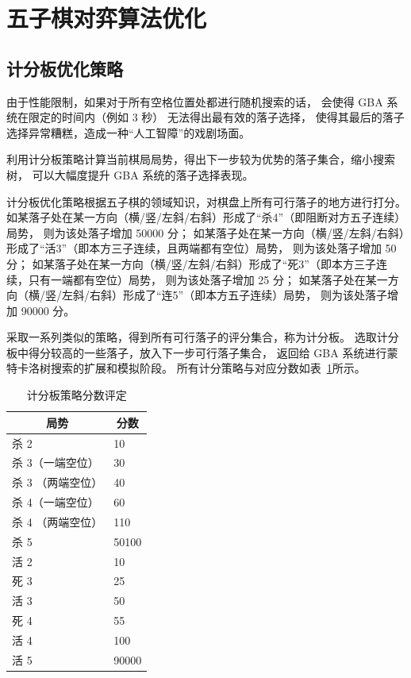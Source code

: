 \documentclass[UTF8,cs4size]{ctexart}
\begin{document}
\section{五子棋对弈算法优化}
\subsection{计分板优化策略}
由于性能限制，如果对于所有空格位置处都进行随机搜索的话，
会使得 GBA 系统在限定的时间内（例如 3 秒） 无法得出最有效的落子选择，
使得其最后的落子选择异常糟糕，造成一种“人工智障”的戏剧场面。

利用计分板策略计算当前棋局局势，得出下一步较为优势的落子集合，缩小搜索树，
可以大幅度提升 GBA 系统的落子选择表现。

计分板优化策略根据五子棋的领域知识，对棋盘上所有可行落子的地方进行打分。
如某落子处在某一方向（横/竖/左斜/右斜）形成了“杀4”（即阻断对方五子连续）局势，
则为该处落子增加 50000 分；
如某落子处在某一方向（横/竖/左斜/右斜）形成了“活3”（即本方三子连续，且两端都有空位）局势，
则为该处落子增加 50 分；
如某落子处在某一方向（横/竖/左斜/右斜）形成了“死3”（即本方三子连续，只有一端都有空位）局势，
则为该处落子增加 25 分；
如某落子处在某一方向（横/竖/左斜/右斜）形成了“连5”（即本方五子连续）局势，
则为该处落子增加 90000 分。

采取一系列类似的策略，得到所有可行落子的评分集合，称为计分板。
选取计分板中得分较高的一些落子，放入下一步可行落子集合，
返回给 GBA 系统进行蒙特卡洛树搜索的扩展和模拟阶段。
所有计分策略与对应分数如表~\ref{tab:score_board}所示。

\begin{table}[htbp]
  \caption{计分板策略分数评定}
  \label{tab:score_board}
  \centering
  \begin{tabular}[c]{l|l}
    \hline
    \multicolumn{1}{c|}{\textbf{局势}} & 
    \multicolumn{1}{c}{\textbf{分数}} \\
    \hline
	  杀 2 & 10 \\
	  杀 3（一端空位）& 30 \\
	  杀 3 （两端空位）& 40 \\
	  杀 4（一端空位）& 60 \\
	  杀 4 （两端空位）& 110 \\
	  杀 5 & 50100 \\
	  活 2 & 10 \\
	  死 3 & 25 \\
	  活 3 & 50 \\
	  死 4 & 55 \\
	  活 4 & 100 \\
	  活 5 & 90000 \\
   \hline
  \end{tabular}
\end{table}
\end{document}
